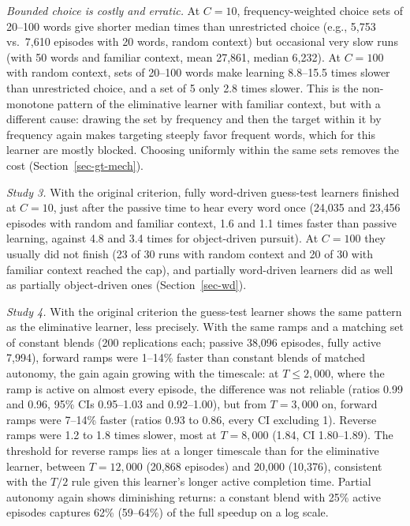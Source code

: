 \documentclass[11pt]{article}
\begin{document}
\textit{Bounded choice is costly and erratic.} At $C=10$, frequency-weighted choice sets of 20--100 words give shorter median times than unrestricted choice (e.g., 5,753 vs.\ 7,610 episodes with 20 words, random context) but occasional very slow runs (with 50 words and familiar context, mean 27,861, median 6,232). At $C=100$ with random context, sets of 20--100 words make learning 8.8--15.5 times slower than unrestricted choice, and a set of 5 only 2.8 times slower. This is the non-monotone pattern of the eliminative learner with familiar context, but with a different cause: drawing the set by frequency and then the target within it by frequency again makes targeting steeply favor frequent words, which for this learner are mostly blocked. Choosing uniformly within the same sets removes the cost (Section~\ref{sec-gt-mech}).


\textit{Study 3.} With the original criterion, fully word-driven guess-test learners finished at $C=10$, just after the passive time to hear every word once (24,035 and 23,456 episodes with random and familiar context, 1.6 and 1.1 times faster than passive learning, against 4.8 and 3.4 times for object-driven pursuit). At $C=100$ they usually did not finish (23 of 30 runs with random context and 20 of 30 with familiar context reached the cap), and partially word-driven learners did as well as partially object-driven ones (Section~\ref{sec-wd}).

\textit{Study 4.} With the original criterion the guess-test learner shows the same pattern as the eliminative learner, less precisely. With the same ramps and a matching set of constant blends (200 replications each; passive 38,096 episodes, fully active 7,994), forward ramps were 1--14\% faster than constant blends of matched autonomy, the gain again growing with the timescale: at $T \le 2{,}000$, where the ramp is active on almost every episode, the difference was not reliable (ratios 0.99 and 0.96, 95\% CIs 0.95--1.03 and 0.92--1.00), but from $T=3{,}000$ on, forward ramps were 7--14\% faster (ratios 0.93 to 0.86, every CI excluding 1). Reverse ramps were 1.2 to 1.8 times slower, most at $T=8{,}000$ (1.84, CI 1.80--1.89). The threshold for reverse ramps lies at a longer timescale than for the eliminative learner, between $T=12{,}000$ (20,868 episodes) and 20,000 (10,376), consistent with the $T/2$ rule given this learner's longer active completion time. Partial autonomy again shows diminishing returns: a constant blend with 25\% active episodes captures 62\% (59--64\%) of the full speedup on a log scale.
\end{document}
